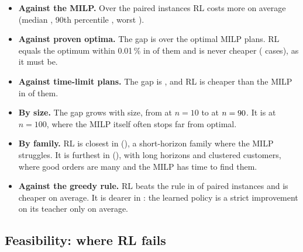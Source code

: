 \begin{itemize}
  \item \textbf{Against the MILP.} Over the \NPaired{} paired instances RL costs \GapMean\pct{} more on average (median \GapMed\pct, 90th percentile \GapP\pct, worst \GapMax\pct).
  \item \textbf{Against proven optima.} The gap is \GapOpt\pct{} over the \NPairedOpt{} optimal MILP plans. RL equals the optimum within 0.01\,\% in \RLequalOpt{} of them and is never cheaper (\RLbelowOpt{} cases), as it must be.
  \item \textbf{Against time-limit plans.} The gap is \GapTl\pct, and RL is cheaper than the MILP in \RLbetterTl{} of them.
  \item \textbf{By size.} The gap grows with size, from \GapTen\pct{} at $n=10$ to \GapMaxNVal\pct{} at $n=90$. It is \GapHundred\pct{} at $n=100$, where the MILP itself often stops far from optimal.
  \item \textbf{By family.} RL is closest in \GapBestFam{} (\GapBestFamVal\pct), a short-horizon family where the MILP struggles. It is furthest in \GapWorstFam{} (\GapWorstFamVal\pct), with long horizons and clustered customers, where good orders are many and the MILP has time to find them.
  \item \textbf{Against the greedy rule.} RL beats the rule in \GreedyBeat{} of \GreedyN{} paired instances and is \GreedyGapAbs\pct{} cheaper on average. It is dearer in \GreedyWorse: the learned policy is a strict improvement on its teacher only on average.
\end{itemize}


\subsection{Feasibility: where RL fails}
\label{sec:feasibility}




